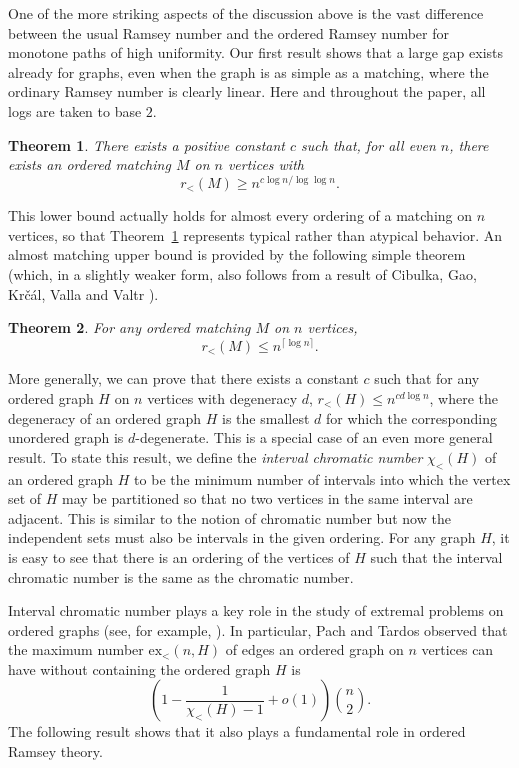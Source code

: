 \documentclass[11pt]{article}
\newtheorem{theorem}{Theorem}[section]
\newcommand{\rord}{r_{<}}
\begin{document}
One of the more striking aspects of the discussion above is the vast difference between the usual Ramsey number and the ordered Ramsey number for monotone paths of high uniformity. Our first result shows that a large gap exists already for graphs, even when the graph is as simple as a matching, where the ordinary Ramsey number is clearly linear. Here and throughout the paper, all logs are taken to base $2$.

\begin{theorem} \label{thm:intromatchlower}
There exists a positive constant $c$ such that, for all even $n$, there exists an ordered matching $M$ on $n$ vertices with
\[\rord(M) \geq n^{c \log n/\log \log n}.\]
\end{theorem}

This lower bound actually holds for almost every ordering of a matching on $n$ vertices, so that Theorem~\ref{thm:intromatchlower} represents typical rather than atypical behavior. An almost matching upper bound is provided by the following simple theorem (which, in a slightly weaker form, also follows from a result of Cibulka, Gao, Kr\v c\'al, Valla and Valtr \cite{CGKVV13}).

\begin{theorem} \label{thm:intromatchupper}
For any ordered matching $M$ on $n$ vertices,
\[\rord(M) \leq n^{\lceil \log n \rceil}.\]
\end{theorem}

More generally, we can prove that there exists a constant $c$ such that for any ordered graph $H$ on $n$ vertices with degeneracy $d$, $\rord(H) \leq n^{c d \log n}$, where the degeneracy of an ordered graph $H$ is the smallest $d$ for which the corresponding unordered graph is $d$-degenerate. This is a special case of an even more general result. To state this result, we define the {\it interval chromatic number} $\chi_< (H)$ of an ordered graph $H$ to be the minimum number of intervals into which the vertex set of $H$ may be partitioned so that no two vertices in the same interval are adjacent. This is similar to the notion of chromatic number but now the independent sets must also be intervals in the given ordering. For any graph $H$, it is easy to see that there is an ordering of the vertices of $H$ such that the interval chromatic number is the same as the chromatic number.

Interval chromatic number plays a key role in the study of extremal problems on ordered graphs (see, for example, \cite{PT06}). In particular, Pach and Tardos \cite{PT06} observed that the maximum number $\textrm{ex}_{<}(n,H)$ of edges an ordered graph on $n$ vertices can have without containing the ordered graph $H$ is  
\[\left(1 - \frac{1}{\chi_<(H) - 1} + o(1)\right) \binom{n}{2}.\] 
The following result shows that it also plays a fundamental role in ordered Ramsey theory.
\end{document}
